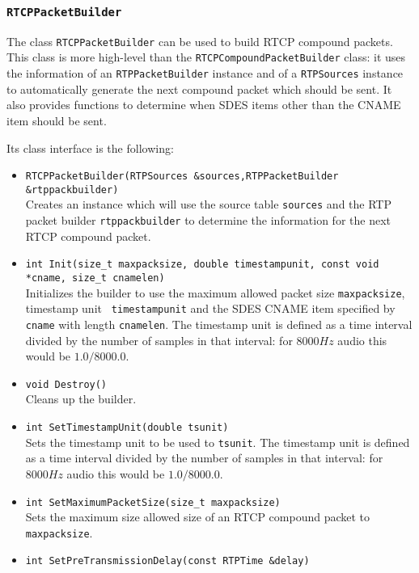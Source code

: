 \documentclass[12pt,a4paper]{article}
\newcommand{\headerfile}[1]{\marginpar{\scriptsize Header:\\{\tt #1}}}
\begin{document}
			\subsubsection{\tt RTCPPacketBuilder}\headerfile{rtcppacketbuilder.h}

				The class {\tt RTCPPacketBuilder} can be used to build RTCP
				compound packets. This class is more high-level than the
				{\tt RTCPCompoundPacketBuilder} class: it uses the information
				of an {\tt RTPPacketBuilder} instance and of a {\tt RTPSources}
				instance to automatically generate the next compound packet which should
				be sent. It also provides functions to determine when SDES items
				other than the CNAME item should be sent.

				Its class interface is the following:
				\begin{itemize}
					\item {\tt RTCPPacketBuilder(RTPSources \&sources,RTPPacketBuilder \&rtppackbuilder)}\\
						Creates an instance which will use the source table
						{\tt sources} and the RTP packet builder {\tt rtppackbuilder}
						to determine the information for the next RTCP compound packet.
					\item {\tt int Init(size\_t maxpacksize, double timestampunit, const void *cname, size\_t cnamelen)}\\
						Initializes the builder to use the maximum allowed
						packet size {\tt maxpacksize}, timestamp unit {\tt
						timestampunit} and the SDES CNAME item specified by {\tt
						cname} with length {\tt cnamelen}. The timestamp unit
						is defined as a time interval divided by the number of
						samples in that interval: for $8000 Hz$ audio this would
						be $1.0/8000.0$.
					\item {\tt void Destroy()}\\
						Cleans up the builder.
					\item {\tt int SetTimestampUnit(double tsunit)}\\
						Sets the timestamp unit to be used to {\tt tsunit}. The
						timestamp unit is defined as a time interval divided
						by the number of samples in that interval: for $8000 Hz$
						audio this would be $1.0/8000.0$.
					\item {\tt int SetMaximumPacketSize(size\_t maxpacksize)}\\
						Sets the maximum size allowed size of an RTCP compound
						packet to {\tt maxpacksize}.
					\item {\tt int SetPreTransmissionDelay(const RTPTime \&delay)}\\

\end{itemize}
\end{document}
